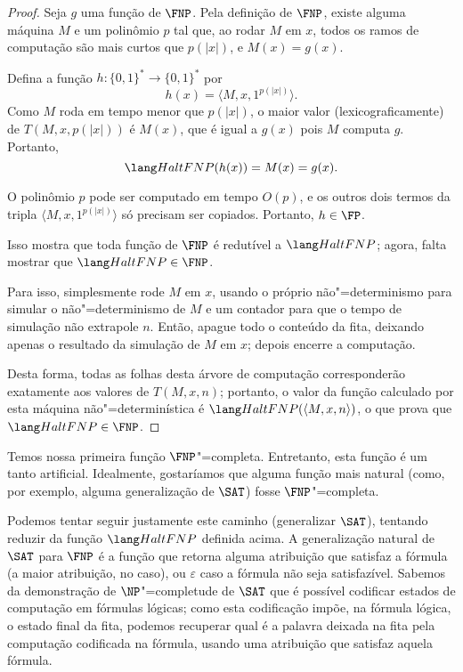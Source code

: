 \begin{proof}
    Seja $g$ uma função de $\FNP$.
    Pela definição de $\FNP$, existe alguma máquina $M$
    e um polinômio $p$ tal que,
    ao rodar $M$ em $x$,
    todos os ramos de computação são mais curtos que $p(|x|)$,
    e $M(x) = g(x)$.

    Defina a função $h: \{0, 1\}^* \to \{0, 1\}^*$
    por
    \begin{equation*}
        h(x) = \langle M, x, 1^{p(|x|)} \rangle.
    \end{equation*}
    Como $M$ roda em tempo menor que $p(|x|)$,
    o maior valor (lexicograficamente) de $T(M, x, p(|x|))$ é $M(x)$,
    que é igual a $g(x)$ pois $M$ computa $g$.
    Portanto,
    \begin{equation*}
        \HaltFNP(h(x)) = M(x) = g(x).
    \end{equation*}

    O polinômio $p$ pode ser computado em tempo $O(p)$,
    e os outros dois termos da tripla $\langle M, x, 1^{p(|x|)} \rangle$
    só precisam ser copiados. Portanto, $h \in \FP$.

    Isso mostra que toda função de $\FNP$ é redutível a $\HaltFNP$;
    agora, falta mostrar que $\HaltFNP \in \FNP$.

    Para isso, simplesmente rode $M$ em $x$,
    usando o próprio não"=determinismo para simular o não"=determinismo de $M$
    e um contador para que o tempo de simulação não extrapole $n$.
    Então, apague todo o conteúdo da fita,
    deixando apenas o resultado da simulação de $M$ em $x$;
    depois encerre a computação.

    Desta forma, todas as folhas desta árvore de computação
    corresponderão exatamente aos valores de $T(M, x, n)$;
    portanto, o valor da função calculado por esta máquina não"=determinística
    é $\HaltFNP(\langle M, x, n \rangle)$,
    o que prova que $\HaltFNP \in \FNP$.
\end{proof}

Temos nossa primeira função $\FNP$"=completa.
Entretanto, esta função é um tanto artificial.
Idealmente, gostaríamos que alguma função mais natural
(como, por exemplo, alguma generalização de $\SAT$)
fosse $\FNP$"=completa.

Podemos tentar seguir justamente este caminho
(generalizar $\SAT$),
tentando reduzir da função $\HaltFNP$ definida acima.
A generalização natural de $\SAT$ para $\FNP$
é a função que retorna alguma atribuição que satisfaz a fórmula
(a maior atribuição, no caso),
ou $\varepsilon$ caso a fórmula não seja satisfazível.
Sabemos da demonstração de $\NP$"=completude de $\SAT$
que é possível codificar estados de computação em fórmulas lógicas;
como esta codificação impõe,
na fórmula lógica,
o estado final da fita,
podemos recuperar qual é a palavra deixada na fita pela computação codificada na fórmula,
usando uma atribuição que satisfaz aquela fórmula.

